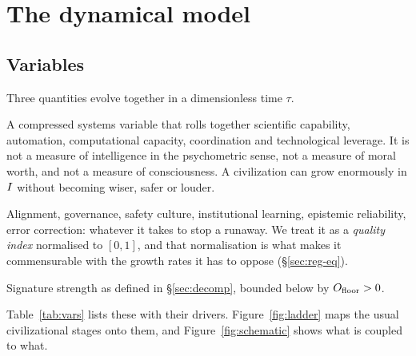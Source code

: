 \section{The dynamical model}
\label{sec:model}

\subsection{Variables}

Three quantities evolve together in a dimensionless time $\tau$.

\begin{description}\itemsep3pt
  \item[$\Icap(\tau)$ --- effective capability.] A compressed systems variable
    that rolls together scientific capability, automation, computational
    capacity, coordination and technological leverage. It is not a measure of
    intelligence in the psychometric sense, not a measure of moral worth, and
    not a measure of consciousness. A civilization can grow enormously in
    $I$ without becoming wiser, safer or louder.
  \item[$\Reg(\tau)$ --- regulatory capacity.] Alignment, governance, safety
    culture, institutional learning, epistemic reliability, error correction:
    whatever it takes to stop a runaway. We treat it as a \emph{quality index}
    normalised to $[0,1]$, and that normalisation is what makes it
    commensurable with the growth rates it has to oppose (\S\ref{sec:reg-eq}).
  \item[$\Obs(\tau)$ --- external observability.] Signature strength as defined
    in \S\ref{sec:decomp}, bounded below by $O_{\mathrm{floor}} > 0$.
\end{description}

Table~\ref{tab:vars} lists these with their drivers. Figure~\ref{fig:ladder}
maps the usual civilizational stages onto them, and Figure~\ref{fig:schematic}
shows what is coupled to what.


